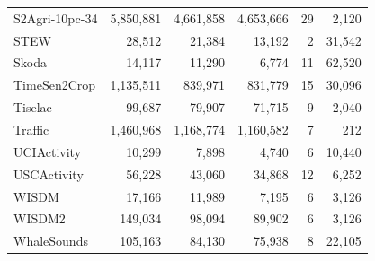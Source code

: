 \documentclass[a4paper, 11pt]{article}
\begin{document}
\begin{table}[h]
\begin{tabular}{lrrrrr}
        S2Agri-10pc-34        & 5,850,881 & 4,661,858 & 4,653,666 & 29      & 2,120          \\
        STEW                  & 28,512    & 21,384    & 13,192    & 2       & 31,542         \\
        Skoda                 & 14,117    & 11,290    & 6,774     & 11      & 62,520         \\
        TimeSen2Crop          & 1,135,511 & 839,971   & 831,779   & 15      & 30,096         \\
        Tiselac               & 99,687    & 79,907    & 71,715    & 9       & 2,040          \\
        Traffic               & 1,460,968 & 1,168,774 & 1,160,582 & 7       & 212            \\
        UCIActivity           & 10,299    & 7,898     & 4,740     & 6       & 10,440         \\
        USCActivity           & 56,228    & 43,060    & 34,868    & 12      & 6,252          \\
        WISDM                 & 17,166    & 11,989    & 7,195     & 6       & 3,126          \\
        WISDM2                & 149,034   & 98,094    & 89,902    & 6       & 3,126          \\
        WhaleSounds           & 105,163   & 84,130    & 75,938    & 8       & 22,105         \\
        \bottomrule
    \end{tabular}
\end{table}
\end{document}
